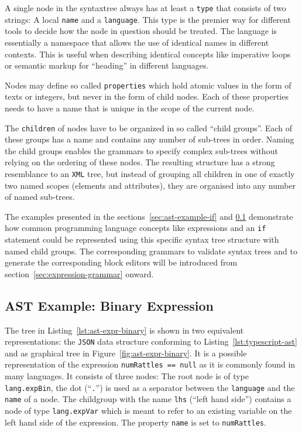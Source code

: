 \documentclass[sigconf,natbib=false]{acmart}
\newcommand{\enquote}[1]{``#1''}
\begin{document}
A single node in the syntaxtree always has at least a \texttt{type} that consists of two strings: A local \texttt{name} and a \texttt{language}. This type is the premier way for different tools to decide how the node in question should be treated. The language is essentially a namespace that allows the use of identical names in different contexts. This is useful when describing identical concepts like imperative loops or semantic markup for \enquote{heading} in different languages.

Nodes may define so called \texttt{properties} which hold atomic values in the form of texts or integers, but never in the form of child nodes. Each of these properties needs to have a name that is unique in the scope of the current node.

The \texttt{children} of nodes have to be organized in so called \enquote{child groups}. Each of these groups has a name and contains any number of sub-trees in order. Naming the child groups enables the grammars to specify complex sub-trees without relying on the ordering of these nodes. The resulting structure has a strong resemblance to an \texttt{XML} tree, but instead of grouping all children in one of exactly two named scopes (elements and attributes), they are organised into any number of named sub-trees.

The examples presented in the sections~\ref{sec:ast-example-if} and \ref{sec:ast-example-expr} demonstrate how common programming language concepts like expressions and an \texttt{if} statement could be represented using this specific syntax tree structure with named child groups. The corresponding grammars to validate syntax trees and to generate the corresponding block editors will be introduced from section~\ref{sec:expression-grammar} onward.

\subsection{AST Example: Binary Expression}
\label{sec:ast-example-expr}
The tree in Listing~\ref{lst:ast-expr-binary} is shown in two equivalent representations: the \texttt{JSON} data structure conforming to Listing~\ref{lst:typescript-ast} and as graphical tree in Figure~\ref{fig:ast-expr-binary}. It is a possible representation of the expression \texttt{numRattles == null} as it is commonly found in many languages. It consists of three nodes: The root node is of type \texttt{lang.expBin}, the dot (\enquote{\texttt{.}}) is used as a separator between the \texttt{language} and the \texttt{name} of a node. The childgroup with the name \texttt{lhs} (\enquote{left hand side}) contains a node of type \texttt{lang.expVar} which is meant to refer to an existing variable on the left hand side of the expression. The property \texttt{name} is set to \texttt{numRattles}.
\end{document}
